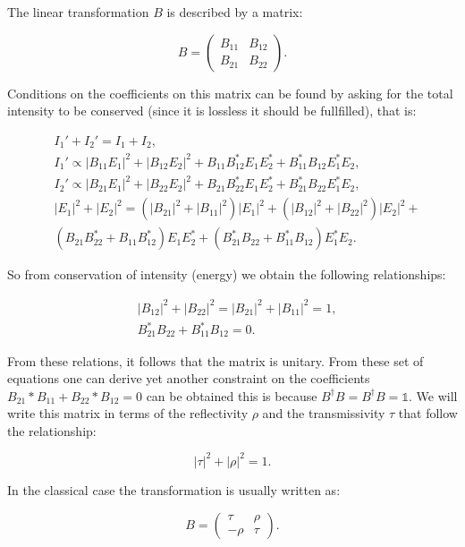 \documentclass{book}
\begin{document}
The linear transformation $B$ is described by a matrix:

\begin{equation}
B=\begin{pmatrix} B_{11}& B_{12} \\B_{21} & B_{22} \end{pmatrix}.
\end{equation}

Conditions on the coefficients on this matrix can be found by asking for the total intensity to be conserved (since it is lossless it should be fullfilled), that is:

\begin{align}
&I_{1}'+I_{2}'=I_{1}+I_{2}, \\
&I_{1}'\propto|B_{11} E_{1}|^{2}+|B_{12} E_{2}|^{2}+B_{11} B_{12}^{*} E_{1} E_{2}^{*}+B_{11}^{*} B_{12} E_{1}^{*} E_{2}, \\
&I_{2}'\propto|B_{21} E_{1}|^{2}+|B_{22} E_{2}|^{2}+B_{21} B_{22}^{*} E_{1} E_{2}^{*}+B_{21}^{*} B_{22} E_{1}^{*} E_{2},\\
&|E_{1}|^{2}+|E_{2}|^{2}=(|B_{21}|^{2}+|B_{11}|^{2})|E_{1}|^{2}+(|B_{12}|^{2}+|B_{22}|^{2})|E_{2}|^{2}+\\
&(B_{21} B_{22}^{*}+B_{11} B_{12}^{*})E_{1} E_{2}^{*}+(B_{21}^{*} B_{22}+B_{11}^{*} B_{12})E_{1}^{*} E_{2}.
\end{align}

So from conservation of intensity (energy) we obtain the following relationships:

\begin{align}
&|B_{12}|^{2}+|B_{22}|^{2}=|B_{21}|^{2}+|B_{11}|^{2}=1,\\
&B_{21}^{*} B_{22}+B_{11}^{*} B_{12}=0.
\end{align}

From these relations, it follows that the matrix is unitary. From these set of equations one can derive yet another constraint on the coefficients $B_{21}* B_{11}+B_{22}* B_{12}=0$ can be obtained this is because $B^{\dagger}B=B^{\dagger}B=\mathbb{1}$. We will write this matrix in terms of the reflectivity $\rho$ and the transmissivity $\tau$ that follow the relationship:

\begin{equation}
|\tau|^{2}+|\rho|^{2}=1.
\end{equation}
 
 In the classical case the transformation is usually written as:
 
 \begin{equation}
 B=\begin{pmatrix} \tau & \rho \\ -\rho & \tau \end{pmatrix}.
 \end{equation}
\end{document}

